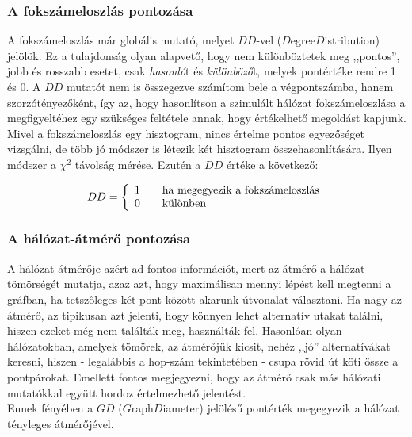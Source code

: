     \subsubsection{A fokszámeloszlás pontozása}
    A fokszámeloszlás már globális mutató, melyet $DD$-vel ($D$egree$D$istribution) jelölök. Ez a tulajdonság olyan alapvető, hogy nem különböztetek meg ,,pontos'', jobb és rosszabb esetet, csak \textit{hasonló}t és \textit{különböző}t, melyek pontértéke rendre 1 és 0. A $DD$ mutatót nem is összegezve számítom bele a végpontszámba, hanem szorzótényezőként, így az, hogy hasonlítson a szimulált hálózat fokszámeloszlása a megfigyeltéhez egy szükséges feltétele annak, hogy értékelhető megoldást kapjunk.\\

    Mivel a fokszámeloszlás egy hisztogram, nincs értelme pontos egyezőséget vizsgálni, de több jó módszer is létezik két hisztogram összehasonlítására. Ilyen módszer a $\chi^2$ távolság mérése. Ezutén a $DD$ értéke a következő:

    $$ DD = \left\{
    \begin{array}{l l}
      1 & \quad \text{ha megegyezik a fokszámeloszlás}\\
      0 & \quad \text{különben}
    \end{array} \right.$$


    \subsubsection{A hálózat-átmérő pontozása}
    A hálózat átmérője azért ad fontos információt, mert az átmérő a hálózat tömörségét mutatja, azaz azt, hogy maximálisan mennyi lépést kell megtenni a gráfban, ha tetszőleges két pont között akarunk útvonalat választani. Ha nagy az átmérő, az tipikusan azt jelenti, hogy könnyen lehet alternatív utakat találni, hiszen ezeket még nem találták meg, használták fel. Hasonlóan olyan hálózatokban, amelyek tömörek, az átmérőjük kicsit, nehéz ,,jó'' alternatívákat keresni, hiszen - legalábbis a hop-szám tekintetében - csupa rövid út köti össze a pontpárokat. Emellett fontos megjegyezni, hogy az átmérő csak más hálózati mutatókkal együtt hordoz értelmezhető jelentést.\\
    Ennek fényében a $GD$ ($G$raph$D$iameter) jelölésű pontérték megegyezik a hálózat tényleges átmérőjével.

